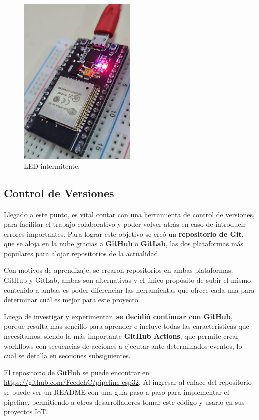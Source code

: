 \begin{figure}[H]
    \centering
    \includegraphics[width=0.5\textwidth]{fig/esp32_2.png}
    \caption{LED intermitente.}
    \label{fig:esp32_2}
\end{figure}

\subsection{Control de Versiones}
Llegado a este punto, es vital contar con una herramienta de control de versiones, para facilitar el trabajo colaborativo y poder volver atrás en caso de introducir errores importantes. Para lograr este objetivo se creó un \textbf{repositorio de Git}, que se aloja en la nube gracias a \textbf{GitHub} o \textbf{GitLab}, las dos plataformas más populares para alojar repositorios de la actualidad.

Con motivos de aprendizaje, se crearon repositorios en ambas plataformas, GitHub y GitLab, ambas son alternativas y el único propósito de subir el mismo contenido a ambas es poder diferenciar las herramientas que ofrece cada una para determinar cuál es mejor para este proyecto.

Luego de investigar y experimentar, \textbf{se decidió continuar con GitHub}, porque resulta más sencillo para aprender e incluye todas las características que necesitamos, siendo la más importante \textbf{GitHub Actions}, que permite crear workflows con secuencias de acciones a ejecutar ante determinados eventos, lo cual se detalla en secciones subsiguientes. 

El repositorio de GitHub se puede encontrar en \url{https://github.com/FeedehC/pipeline-esp32}. Al ingresar al enlace del repositorio se puede ver un README con una guía paso a paso para implementar el pipeline, permitiendo a otros desarrolladores tomar este código y usarlo en sus proyectos IoT. 

